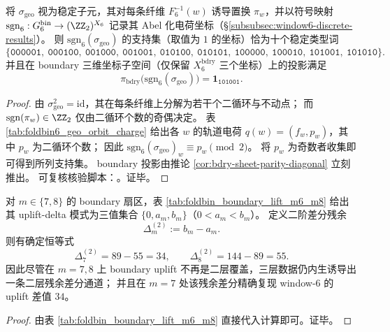 \begin{proposition}\label{prop:window6-geo-parity-charge-support-bdry}
将 \(\sigma_{\mathrm{geo}}\) 视为稳定子元，其对每条纤维 \(F_6^{-1}(w)\) 诱导置换 \(\pi_w\)，并以符号映射
\(
\mathrm{sgn}_6:G^{\mathrm{bin}}_6\to (\ZZ_2)^{X_6}
\)
记录其 Abel 化电荷坐标（\S\ref{subsubsec:window6-discrete-results}）。
则 \(\mathrm{sgn}_6(\sigma_{\mathrm{geo}})\) 的支持集（取值为 \(1\) 的坐标）恰为十个稳定类型词
\[
\{\texttt{000001},\ \texttt{000100},\ \texttt{001000},\ \texttt{001001},\ \texttt{010100},\ \texttt{010101},\ \texttt{100000},\ \texttt{100010},\ \texttt{101001},\ \texttt{101010}\}.
\]
并且在 boundary 三维坐标子空间（仅保留 \(X_6^{\mathrm{bdry}}\) 三个坐标）上的投影满足
\[
\pi_{\mathrm{bdry}}\bigl(\mathrm{sgn}_6(\sigma_{\mathrm{geo}})\bigr)=\mathbf 1_{\texttt{101001}}.
\]
\end{proposition}
\begin{proof}
由 \(\sigma_{\mathrm{geo}}^2=\mathrm{id}\)，其在每条纤维上分解为若干个二循环与不动点；
而 \(\mathrm{sgn}(\pi_w)\in\ZZ_2\) 仅由二循环个数的奇偶决定。
表 \ref{tab:foldbin6_geo_orbit_charge} 给出各 \(w\) 的轨道电荷 \(q(w)=(f_w,p_w)\)，其中 \(p_w\) 为二循环个数；
因此 \(\mathrm{sgn}_6(\sigma_{\mathrm{geo}})_w\equiv p_w\pmod 2\)。
将 \(p_w\) 为奇数者收集即可得到所列支持集。
boundary 投影由推论 \ref{cor:bdry-sheet-parity-diagonal} 立刻推出。
可复核核验脚本：\texttt{}。证毕。
\end{proof}

\begin{theorem}\label{thm:bdry-uplift-second-difference-residual-law}
对 \(m\in\{7,8\}\) 的 boundary 扇区，表 \ref{tab:foldbin_boundary_lift_m6_m8} 给出其 uplift-delta 模式为三值集合 \(\{0,a_m,b_m\}\)（\(0<a_m<b_m\)）。
定义二阶差分残余
\[
\Delta_m^{(2)}:=b_m-a_m.
\]
则有确定恒等式
\[
\Delta_{7}^{(2)}=89-55=34,
\qquad
\Delta_{8}^{(2)}=144-89=55.
\]
因此尽管在 \(m=7,8\) 上 boundary uplift 不再是二层覆盖，三层数据仍内生诱导出一条二层残余差分通道；
并且在 \(m=7\) 处该残余差分精确复现 window-\(6\) 的 uplift 差值 \(34\)。
\end{theorem}
\begin{proof}
由表 \ref{tab:foldbin_boundary_lift_m6_m8} 直接代入计算即可。证毕。
\end{proof}

